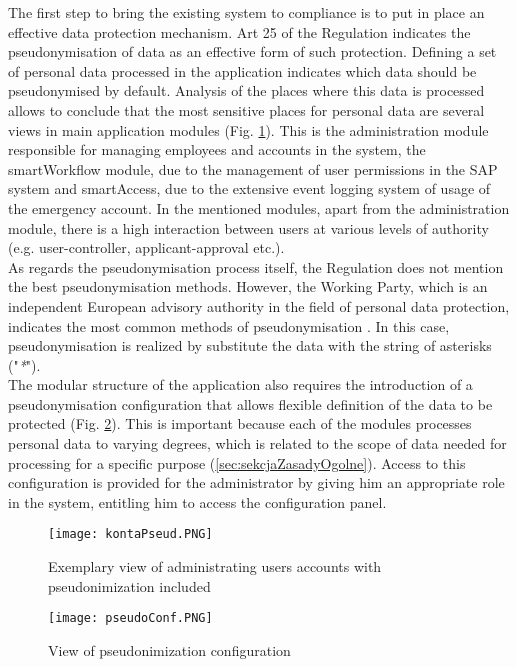 \documentclass[en, noamssymb]{mgr}
\begin{document}
The first step to bring the existing system to compliance is to put in place an effective data protection mechanism. Art 25 of the Regulation indicates the pseudonymisation of data as an effective form of such protection. Defining a set of personal data processed in the application indicates which data should be pseudonymised by default. Analysis of the places where this data is processed allows to conclude that the most sensitive places for personal data are several views in main application modules (Fig. \ref{fig:accountsAdministrationPseudonimized}). This is the administration module responsible for managing employees and accounts in the system, the smartWorkflow module, due to the management of user permissions in the SAP system and smartAccess, due to the extensive event logging system of usage of the emergency account. In the mentioned modules, apart from the administration module, there is a high interaction between users at various levels of authority (e.g. user-controller, applicant-approval etc.).\\
\indent As regards the pseudonymisation process itself, the Regulation does not mention the best pseudonymisation methods. However, the Working Party, which is an independent European advisory authority in the field of personal data protection, indicates the most common methods of pseudonymisation \cite{pseudonimizacja_2017}. In this case, pseudonymisation is realized by substitute the data with the string of asterisks ("\textit{*}").\\
\indent The modular structure of the application also requires the introduction of a pseudonymisation configuration that allows flexible definition of the data to be protected (Fig. \ref{fig:pseudonimizationConf}). This is important because each of the modules processes personal data to varying degrees, which is related to the scope of data needed for processing for a specific purpose (\ref{sec:sekcjaZasadyOgolne}). Access to this configuration is provided for the administrator by giving him an appropriate role in the system, entitling him to access the configuration panel.

\begin{figure}[H]
	\centering
	\texttt{[image: kontaPseud.PNG]}
	\caption[Exemplary view of administrating users accounts with pseudonimization included]{Exemplary view of administrating users accounts with pseudonimization included}
	\label{fig:accountsAdministrationPseudonimized}
\end{figure}

\begin{figure}[H]
	\centering
	\texttt{[image: pseudoConf.PNG]}
	\caption[View of pseudonimization configuration]{View of pseudonimization configuration}
	\label{fig:pseudonimizationConf}
\end{figure}
\end{document}
